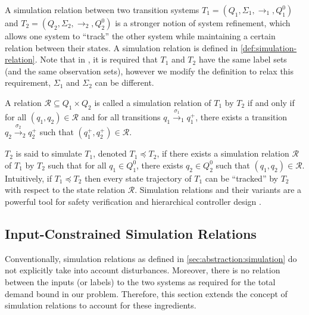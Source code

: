 A simulation relation between two transition systems $T_1 = (Q_1, \Sigma_1,
\rightarrow_1, Q^0_1)$ and $T_2 = (Q_2, \Sigma_2, \rightarrow_2, Q^0_2)$ is a
stronger notion of system refinement, which allows one system to ``track'' the
other system while maintaining a certain relation between their states. A
simulation relation is defined in \cref{def:simulation-relation}. Note that in
\cite{girardetal07amd}, it is required that $T_1$ and $T_2$ have the same
label sets (and the same observation sets), however we modify the definition
to relax this requirement, \ie $\Sigma_1$ and $\Sigma_2$ can be different.

\begin{definition}[Simulation]
  \label{def:simulation-relation}A relation $\mathcal{R} \subseteq Q_1 \times
  Q_2$ is called a simulation relation of $T_1$ by $T_2$ if and only if for all $(q_1,
  q_2) \in \mathcal{R}$ and for all transitions $q_1 \xrightarrow{\sigma_1}_{1}
  q^+_1$, there exists a transition $q_2 \xrightarrow{\sigma_2}_{2}
  q^+_2$ such that $(q_1^+, q_2^+) \in \mathcal{R}$.
\end{definition}

$T_2$ is said to simulate $T_1$, denoted $T_1 \preceq T_2$, if there exists a
simulation relation $\mathcal{R}$ of $T_1$ by $T_2$ such that for all $q_1 \in
Q^0_1$, there exists $q_2 \in Q^0_2$ such that $(q_1, q_2) \in \mathcal{R}$.
Intuitively, if $T_1 \preceq T_2$ then every state trajectory of $T_1$ can be
``tracked'' by $T_2$ with respect to the state relation $\mathcal{R}$.
Simulation relations and their variants are a powerful tool for safety verification and
hierarchical controller design \cite{clarkeetal99m,pappasetal00hcc,GirardEtAl06vus,girardetal07amd}.

\subsection{Input-Constrained Simulation Relations}
\label{sec:abstraction:ext-simulation}

Conventionally, simulation relations as defined in \cref{sec:abstraction:simulation} do not explicitly take into account %
disturbances.  Moreover, there is no relation between the inputs (or labels) to the two systems as required for the total demand bound in our problem.  Therefore, this section extends the concept of simulation relations to account for these ingredients.

